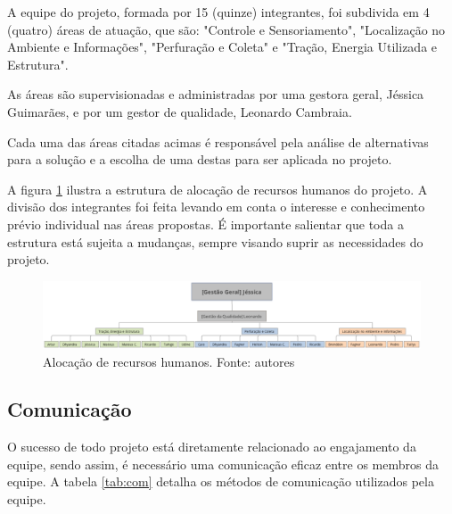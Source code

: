       A equipe do projeto, formada por 15 (quinze) integrantes, foi
      subdivida em 4 (quatro) áreas de atuação, que são: "Controle
      e Sensoriamento", "Localização no Ambiente e Informações", "Perfuração
      e Coleta" e "Tração, Energia Utilizada e Estrutura".

      As áreas são supervisionadas e administradas por uma gestora geral, Jéssica Guimarães,
      e por um gestor de qualidade, Leonardo Cambraia.

      Cada uma das áreas citadas acimas é responsável pela análise de alternativas
      para a solução e a escolha de uma destas para ser aplicada no projeto.

      A figura \ref{fig:aloc} ilustra a estrutura de alocação de recursos humanos do
      projeto. A divisão dos integrantes foi feita levando em conta o
      interesse e conhecimento prévio individual nas áreas propostas.
      É importante salientar que toda a estrutura está sujeita a mudanças, sempre
      visando suprir as necessidades do projeto.

      \begin{figure}[!htbp]
        \centering
        \includegraphics[width=\textwidth]{figuras/alocacao.eps}
        \caption{Alocação de recursos humanos. Fonte: autores}
        \label{fig:aloc}
      \end{figure}

    \subsection{Comunicação}

      O sucesso de todo projeto está diretamente relacionado ao engajamento
      da equipe, sendo assim, é necessário uma comunicação eficaz entre os
      membros da equipe. A tabela \ref{tab:com} detalha os métodos de comunicação
      utilizados pela equipe.

